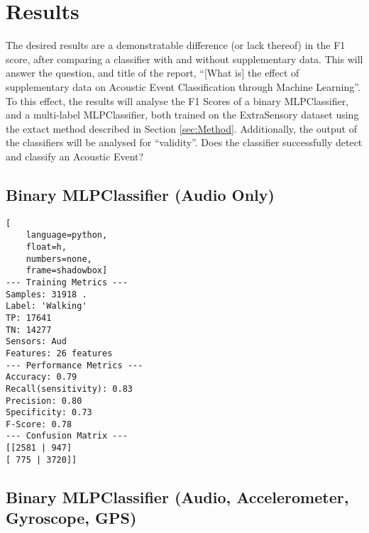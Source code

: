 \documentclass{UoNMCHA}
\newcommand{\inlineQuote}[1]{``#1''}
\numberwithin{equation}{section}
\begin{document}



\section{Results} \label{sec:Results}

The desired results are a demonstratable difference (or lack thereof) in the F1 score, after comparing a classifier with and without supplementary data.
This will answer the question, and title of the report, \inlineQuote{[What is] the  effect of supplementary data on Acoustic Event Classification through Machine Learning}. To this effect, the results will analyse the F1 Scores of a binary MLPClassifier, and a multi-label MLPClassifier, both trained on the ExtraSensory dataset using the extact method described in Section \ref{sec:Method}.
Additionally, the output of the classifiers will be analysed for \inlineQuote{validity}. Does the classifier successfully detect and classify an Acoustic Event?


\subsection{Binary MLPClassifier (Audio Only)}

\begin{lstlisting}[
    language=python,
    float=h,
    numbers=none,
    frame=shadowbox]
--- Training Metrics ---
Samples: 31918 . 
Label: 'Walking'
TP: 17641 
TN: 14277
Sensors: Aud
Features: 26 features 
--- Performance Metrics ---
Accuracy: 0.79
Recall(sensitivity): 0.83
Precision: 0.80
Specificity: 0.73
F-Score: 0.78
--- Confusion Matrix ---
[[2581 | 947]
[ 775 | 3720]]
\end{lstlisting}

\subsection{Binary MLPClassifier (Audio, Accelerometer, Gyroscope, GPS)}
\end{document}
